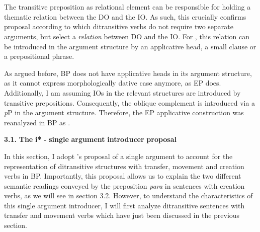 \documentclass[output=paper,modfonts,nonflat]{langsci/langscibook}
\begin{document}
\begin{styleBodyTextii}\end{styleBodyTextii}

 
\begin{styleBodyTextii}
\ea%
    \label{ex:key:15}
    \gll\\
        \\
    \glt
    \z

         
\end{styleBodyTextii}

\begin{styleFootnote}
The transitive preposition as relational element can be responsible for holding a thematic relation between the DO and the IO. As such, this crucially confirms  proposal according to which ditransitive verbs do not require two separate arguments, but select a \textit{relation} between DO and the IO. For \citet{Cuervo2010}, this relation can be introduced in the argument structure by an applicative head, a small clause or a prepositional phrase.
\end{styleFootnote}

\begin{styleFootnote}
As argued before, BP does not have applicative heads in its argument structure, as it cannot express morphologically dative case anymore, as EP does. Additionally, I am assuming IOs in the relevant structures are introduced by transitive prepositions. Consequently, the oblique complement is introduced via a \textit{p}P in the argument structure. Therefore, the EP applicative construction  was reanalyzed in BP as .
\end{styleFootnote}

\textbf{3.1.} \textbf{The} \textbf{i*} \textbf{-} \textbf{single} \textbf{argument} \textbf{introducer} \textbf{proposal}

In this section, I adopt \citet{WoodMarantz2017}’s proposal of a single argument to account for the representation of ditransitive structures with transfer, movement and creation verbs in BP. Importantly, this proposal allows us to explain the two different semantic readings conveyed by the preposition \textit{para} in sentences with creation verbs, as we will see in section 3.2. However, to understand the characteristics of this single argument introducer, I will first analyze ditransitive sentences with transfer and movement verbs which have just been discussed in the previous section.
\end{document}
